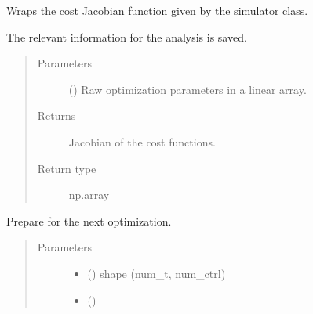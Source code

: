 \documentclass[letterpaper,10pt,english]{sphinxmanual}
\begin{document}
\begin{fulllineitems}
\begin{fulllineitems}
\label{\detokenize{qsim:qsim.optimize.Optimizer.cost_jacobian_wrapper}}
Wraps the cost Jacobian function given by the simulator class.

The relevant information for the analysis is saved.
\begin{quote}\begin{description}
\item[{Parameters}] \leavevmode
{} () \textendash{} Raw optimization parameters in a linear array.

\item[{Returns}] \leavevmode
{} \textendash{} Jacobian of the cost functions.

\item[{Return type}] \leavevmode
np.array

\end{description}\end{quote}

\end{fulllineitems}


\begin{fulllineitems}
\label{\detokenize{qsim:qsim.optimize.Optimizer.prepare_optimization}}
Prepare for the next optimization.
\begin{quote}\begin{description}
\item[{Parameters}] \leavevmode\begin{itemize}
\item {} 
 () \textendash{} shape (num\_t, num\_ctrl)

\item {} 
 () \textendash{} 


\end{itemize}
\end{description}
\end{quote}
\end{fulllineitems}
\end{fulllineitems}
\end{document}
